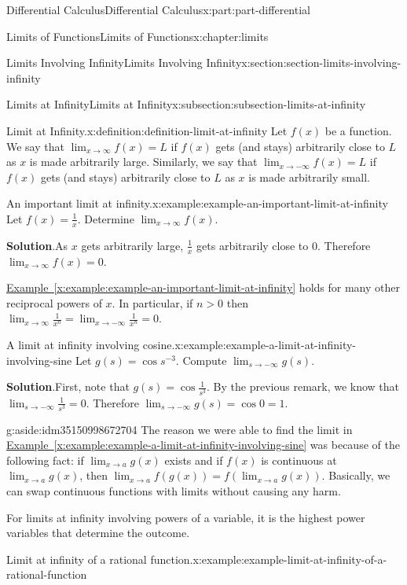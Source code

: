 \documentclass[twoside,10pt,]{book}
\newcommand{\blocktitlefont}{\relax}
\newcommand{\xreffont}{\relax}
\numberwithin{equation}{part}
\begin{document}
\begin{partptx}{Differential Calculus}{}{Differential Calculus}{}{}{x:part:part-differential}
\begin{chapterptx}{Limits of Functions}{}{Limits of Functions}{}{}{x:chapter:limits}
\begin{sectionptx}{Limits Involving Infinity}{}{Limits Involving Infinity}{}{}{x:section:section-limits-involving-infinity}
\begin{subsectionptx}{Limits at Infinity}{}{Limits at Infinity}{}{}{x:subsection:subsection-limits-at-infinity}
\begin{definition}{Limit at Infinity.}{x:definition:definition-limit-at-infinity}
Let \(f(x)\) be a function. We say that \(\lim_{x\to\infty}f(x) = L\) if \(f(x)\) gets (and stays) arbitrarily close to \(L\) as \(x\) is made arbitrarily large. Similarly, we say that \(\lim_{x\to-\infty}f(x) = L\) if \(f(x)\) gets (and stays) arbitrarily close to \(L\) as \(x\) is made arbitrarily small.%
\end{definition}
\begin{example}{An important limit at infinity.}{x:example:example-an-important-limit-at-infinity}%
Let \(f(x) = \frac{1}{x}\). Determine \(\lim_{x\to\infty}f(x)\).%
\par\smallskip%
\noindent\textbf{\blocktitlefont Solution}.\hypertarget{g:solution:idm35150998679872}{}\quad{}As \(x\) gets arbitrarily large, \(\frac{1}{x}\) gets arbitrarily close to \(0\). Therefore \(\lim_{x\to\infty}f(x) = 0\).%
\end{example}
\hyperref[x:example:example-an-important-limit-at-infinity]{Example~{\xreffont\ref{x:example:example-an-important-limit-at-infinity}}} holds for many other reciprocal powers of \(x\). In particular, if \(n>0\) then \(\lim_{x\to\infty}\frac{1}{x^{n}} = \lim_{x\to-\infty}\frac{1}{x^{n}} = 0\).%
\begin{example}{A limit at infinity involving cosine.}{x:example:example-a-limit-at-infinity-involving-sine}%
Let \(g(s) = \cos s^{-3}\). Compute \(\lim_{s\to-\infty}g(s)\).%
\par\smallskip%
\noindent\textbf{\blocktitlefont Solution}.\hypertarget{g:solution:idm35150998674240}{}\quad{}First, note that \(g(s) = \cos\frac{1}{s^{3}}\). By the previous remark, we know that \(\lim_{s\to-\infty}\frac{1}{s^{3}} = 0\). Therefore \(\lim_{s\to-\infty}g(s) = \cos0 = 1\).%
\end{example}
\begin{aside}{}{g:aside:idm35150998672704}%
The reason we were able to find the limit in \hyperref[x:example:example-a-limit-at-infinity-involving-sine]{Example~{\xreffont\ref{x:example:example-a-limit-at-infinity-involving-sine}}} was because of the following fact: if \(\lim_{x\to a}g(x)\) exists and if \(f(x)\) is continuous at \(\lim_{x\to a}g(x)\), then \(\lim_{x\to a}f(g(x)) = f(\lim_{x\to a}g(x))\). Basically, we can swap continuous functions with limits without causing any harm.%
\end{aside}
For limits at infinity involving powers of a variable, it is the highest power variables that determine the outcome.%
\begin{example}{Limit at infinity of a rational function.}{x:example:example-limit-at-infinity-of-a-rational-function}%

\end{example}
\end{subsectionptx}
\end{sectionptx}
\end{chapterptx}
\end{partptx}
\end{document}
